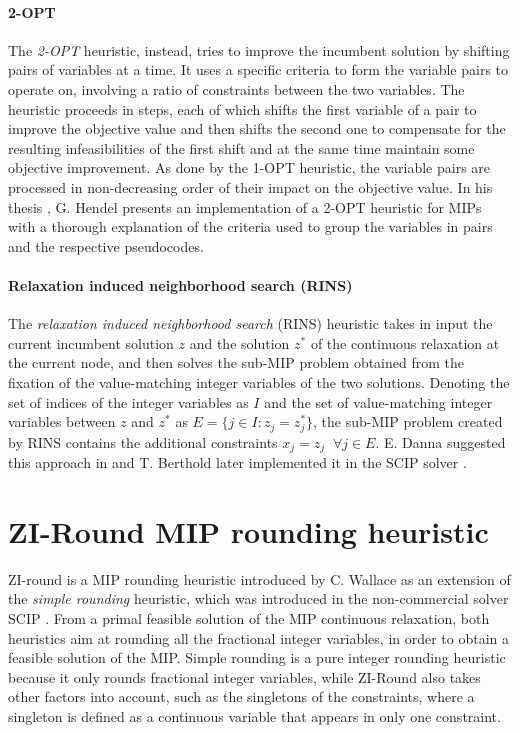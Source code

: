 \documentclass[a4paper,12pt,twoside]{scrbook}
\begin{document}
\subsubsection{2-OPT}
The \textit{2-OPT} heuristic, instead, tries to improve the incumbent solution by shifting pairs of variables at a time. It uses a specific criteria to form the variable pairs to operate on, involving a ratio of constraints between the two variables. The heuristic proceeds in steps, each of which shifts the first variable of a pair to improve the objective value and then shifts the second one to compensate for the resulting infeasibilities of the first shift and at the same time maintain some objective improvement. As done by the 1-OPT heuristic, the variable pairs are processed in non-decreasing order of their impact on the objective value. In his thesis \cite{hendel2011}, G. Hendel presents an implementation of a 2-OPT heuristic for MIPs with a thorough explanation of the criteria used to group the variables in pairs and the respective pseudocodes.
\subsubsection{Relaxation induced neighborhood search (RINS)}
The \textit{relaxation induced neighborhood search} (RINS) heuristic takes in input the current incumbent solution $z$ and the solution $z^*$ of the continuous relaxation at the current node, and then solves the sub-MIP problem obtained from the fixation of the value-matching integer variables of the two solutions. Denoting the set of indices of the integer variables as $I$ and the set of value-matching integer variables between $z$ and $z^*$ as $E = \{j \in I : z_j = z^*_j\}$, the sub-MIP problem created by RINS contains the additional constraints $x_j = z_j \;\; \forall j \in E$. E. Danna suggested this approach in \cite{danna2005} and T. Berthold later implemented it in the SCIP solver \cite{berthold2006}.

\chapter{ZI-Round MIP rounding heuristic} \label{ch:ziround}
ZI-round is a MIP rounding heuristic introduced by C. Wallace \cite{wallace2010} as an extension of the \textit{simple rounding} heuristic, which was introduced in the non-commercial solver SCIP \cite{scip}.
From a primal feasible solution of the MIP continuous relaxation, both heuristics aim at rounding all the fractional integer variables, in order to obtain a feasible solution of the MIP. Simple rounding is a pure integer rounding heuristic because it only rounds fractional integer variables, while ZI-Round also takes other factors into account, such as the singletons of the constraints, where a singleton is defined as a continuous variable that appears in only one constraint. \par
\end{document}
